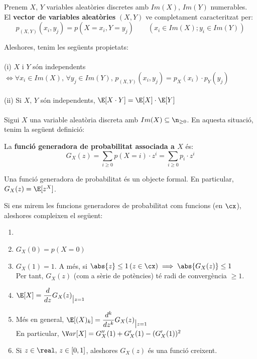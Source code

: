 \begin{defi}
  Prenem $X$, $Y$ variables aleatòries discretes amb $Im(X), \, Im(Y)$ numerables. \\
  El \textbf{vector de variables aleatòries} $(X,Y)$ ve completament caracteritzat per: 
  \[
    p_{(X,Y)}(x_{i},y_{j}) = p(X=x_{i}, Y=y_{j}) \qquad (x_{i}\in Im(X); y_{i}\in Im(Y))
  \]
\end{defi}

\newpage
Aleshores, tenim les següents propietats: \\\\
(i) $X$ i $Y$ són independents $\iff \forall x_{i}\in Im(X), \, \forall y_{j}\in Im(Y), \, p_{(X, Y)}(x_{i},y_{j}) = p_{X}(x_{i})\cdot p_{Y}(y_{j})$ \\\\
(ii) Si $X, \, Y$ són independents, $\E[X\cdot Y] = \E[X]\cdot \E[Y]$ \\\\

Sigui $X$ una variable aleatòria discreta amb $Im(X)\subseteq \n_{\geq0}$. En aquesta situació, tenim la següent definició:

\begin{defi}
  La \textbf{funció generadora de probabilitat associada a $X$} és: 
  \[
    G_{X}(z) = \sum_{i\geq 0}p(X=i)\cdot z^{i} = \sum_{i\geq 0}p_{i}\cdot z^{i}
  \]
  
  Una funció generadora de probabilitat és un objecte formal. En particular, $G_{X}(z)=\E[z^{X}]$.
\end{defi}

Si ens mirem les funcions generadores de probabilitat com funcions (en $\cx$), aleshores compleixen el següent:

\begin{prop}
  \begin{enumerate}
      \item []
      \item $G_{X}(0) = p(X=0)$
      \item $G_{X}(1) = 1$. A més, si $\abs{z}\leq 1 \, (z\in \cx) \implies \abs{G_{X}(z)}\leq 1$ \\
      Per tant, $G_{X}(z)$ (com a sèrie de potències) té radi de convergència $\geq 1$.
      \item $\E[X] = \dfrac{d}{dz}G_{X}(z)_{\big|z=1}$
      \item Més en general, $\E[(X)_{k}] = \dfrac{d^{k}}{dz^{k}}G_{X}(z)_{\big|z=1}$ \\
      En particular, $\V ar[X] = G_{X}''(1) + G_{X}'(1) - (G_{X}'(1))^{2}$
      \item Si $z\in \real, \, z \in [0,1]$, aleshores $G_{X}(z)$ és una funció creixent.
  \end{enumerate}
\end{prop}

